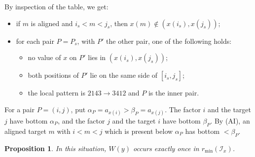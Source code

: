 \documentclass[a4paper,12pt,leqno]{amsart}
\newcommand{\caI}{\mathcal{I}}
\theoremstyle{plain}
\newtheorem{prop}[thm]{Proposition}
\theoremstyle{definition}
\theoremstyle{definition}
\begin{document}
By inspection of the table, we get:
\begin{itemize}
\item[(AI)] if $m$ is aligned and $i_s<m<j_s$, then $x(m)\notin(x(i_s),x(j_s))$;
\item[(Sep)] for each pair $P=P_s$, with $P'$ the other pair, one of the following holds:
\begin{itemize}
\item[(I)] no value of $x$ on $P'$ lies in $(x(i_s),x(j_s))$;
\item[(II)] both positions of $P'$ lie on the same side of $[i_s,j_s]$;
\item[(III)] the local pattern is $2143\rightarrow3412$ and $P$ is the inner pair.
\end{itemize}
\end{itemize}
For a pair $P=(i,j)$, put $\alpha_P=a_{x(i)}>\beta_P=a_{x(j)}$. The factor $i$ and the target $j$
have bottom $\alpha_P$, and the factor $j$ and the target $i$ have bottom $\beta_P$. By (AI), an
aligned target $m$ with $i<m<j$ which is present below $\alpha_P$ has bottom $<\beta_P$.

\begin{prop}\label{prop:fourpos} In this situation, $W(y)$ occurs exactly once in $r_{\min}(\caI_x)$.
\end{prop}
\end{document}
